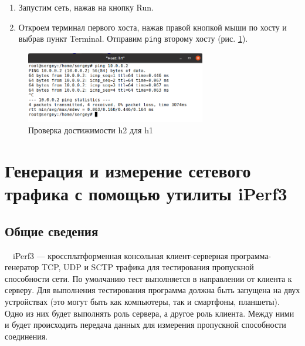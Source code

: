 \documentclass[
  13pt,
  fontsize=13pt,
  russian,
  a4paper,
,captions=tableheading
]{scrreprt}
\begin{document}
\begin{enumerate}
\def\labelenumi{\arabic{enumi}.}
\setcounter{enumi}{5}
\item
  Запустим сеть, нажав на кнопку Run.
\item
  Откроем терминал первого хоста, нажав правой кнопкой мыши по хосту и
  выбрав пункт Terminal. Отправим \texttt{ping} второму хосту
  (рис. \ref{fig:0005}).
\end{enumerate}

\begin{figure}
\hypertarget{fig:0005}{%
\centering
\includegraphics[width=0.7\textwidth,height=\textheight]{mininet_2.5.png}
\caption{Проверка достижимости h2 для h1}\label{fig:0005}
}
\end{figure}

\hypertarget{ux433ux435ux43dux435ux440ux430ux446ux438ux44f-ux438-ux438ux437ux43cux435ux440ux435ux43dux438ux435-ux441ux435ux442ux435ux432ux43eux433ux43e-ux442ux440ux430ux444ux438ux43aux430-ux441-ux43fux43eux43cux43eux449ux44cux44e-ux443ux442ux438ux43bux438ux442ux44b-iperf3}{%
\chapter{Генерация и измерение сетевого трафика с помощью утилиты
iPerf3}\label{ux433ux435ux43dux435ux440ux430ux446ux438ux44f-ux438-ux438ux437ux43cux435ux440ux435ux43dux438ux435-ux441ux435ux442ux435ux432ux43eux433ux43e-ux442ux440ux430ux444ux438ux43aux430-ux441-ux43fux43eux43cux43eux449ux44cux44e-ux443ux442ux438ux43bux438ux442ux44b-iperf3}}

\hypertarget{ux43eux431ux449ux438ux435-ux441ux432ux435ux434ux435ux43dux438ux44f}{%
\section{Общие
сведения}\label{ux43eux431ux449ux438ux435-ux441ux432ux435ux434ux435ux43dux438ux44f}}

\(\quad\)iPerf3 \autocite{iperf} --- кроссплатформенная консольная
клиент-серверная программа-генератор TCP, UDP и SCTP трафика для
тестирования пропускной способности сети. По умолчанию тест выполняется
в направлении от клиента к серверу. Для выполнения тестирования
программа должна быть запущена на двух устройствах (это могут быть как
компьютеры, так и смартфоны, планшеты). Одно из них будет выполнять роль
сервера, а другое роль клиента. Между ними и будет происходить передача
данных для измерения пропускной способности соединения.
\end{document}
